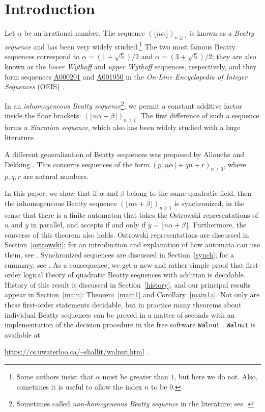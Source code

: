 \documentclass[12pt,reqno]{article}
\newcommand{\seqnum}[1]{\href{https://oeis.org/#1}{\rm \underline{#1}}}
\begin{document}
\section{Introduction}

Let $\alpha$ be an irrational number.   The sequence
$(\lfloor n \alpha \rfloor)_{n \geq 1}$ is
known as a {\it Beatty sequence\/}
\cite{Beatty:1926} and has been very widely studied.\footnote{Some
authors \cite{Dekking:2023} insist that $\alpha$ must be greater than $1$, but
here we do not. Also, sometimes it is useful to allow the index $n$ to be $0$.}   The two most famous Beatty sequences correspond to
$\alpha = (1+\sqrt{5})/2$ and $\alpha= (3+\sqrt{5})/2$; they are 
also known as the
{\it lower Wythoff\/} and {\it upper Wythoff\/} sequences, respectively, and they
form sequences
\seqnum{A000201} and \seqnum{A001950} in the {\it On-Line Encyclopedia of Integer Sequences} (OEIS)
\cite{Sloane:2026}.

In an {\it inhomogeneous Beatty sequence}\footnote{Sometimes called {\it non-homogeneous Beatty sequence\/} in the literature; see \cite{Fraenkel:1969}.}, we permit a constant
additive factor
inside the floor brackets:  $(\lfloor n \alpha + \beta \rfloor)_{n \geq 1}$.
The first difference of such a sequence forms a
{\it Sturmian sequence}, which also has been widely
studied with a huge literature \cite{Lothaire:2002,Berstel&Lauve&Reutenauer&Saliola:2009}.

A different generalization of Beatty sequences was proposed by
Allouche and Dekking \cite{Allouche&Dekking:2019}.
This concerns sequences of the form
$(p \lfloor n \alpha \rfloor + qn + r)_{n \geq 0}$, where $p, q, r$ are
natural numbers.

In this paper, we show that if $\alpha$ and $\beta$ belong to the same quadratic field, then the inhomogeneous
Beatty sequence $(\lfloor n \alpha + \beta \rfloor)_{n \geq 1}$
is synchronized, in the sense that there is a finite automaton that takes
the Ostrowski representations of $n$ and $y$ in parallel, and
accepts if and only if $y =  \lfloor n \alpha + \beta \rfloor$.  Furthermore,
the converse of this theorem also holds.
Ostrowski representations are discussed in Section~\ref{ostrowski}; for an introduction and explanation of how automata can use them, see \cite{Baranwal&Schaeffer&Shallit:2021}. Synchronized sequences are discussed in Section~\ref{synch}; for a summary, see \cite{Shallit:2021h}.  As a consequence, we get a new and rather simple proof that first-order logical theory of quadratic Beatty sequences with addition is decidable.  History of this result is discussed in Section~\ref{history}, and our principal results
appear in Section~\ref{main}: Theorem~\ref{main1} and Corollary~\ref{main1a}.   Not only are these first-order statements decidable, but in practice many theorems about individual Beatty sequences can be proved in a matter of seconds with an implementation of the decision procedure in the free software {\tt Walnut} \cite{Mousavi:2016,Shallit:2023}.   {\tt Walnut} is available at \\
\centerline{\url{https://cs.uwaterloo.ca/~shallit/walnut.html} .}
\end{document}

